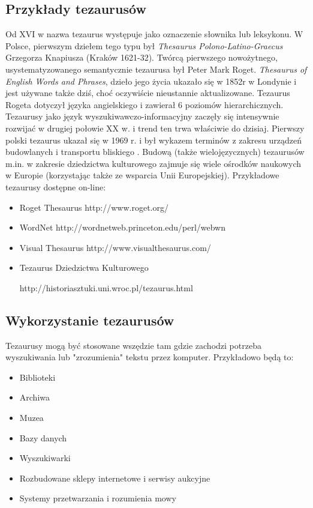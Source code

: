 \documentclass[12pt,a4paper,notitlepage]{article}
\begin{document}
\subsection{Przykłady tezaurusów}
Od XVI w nazwa tezaurus występuje jako oznaczenie słownika lub leksykonu. W Polsce, pierwszym dziełem tego typu był \textit{ Thesaurus Polono-Latino-Graecus} Grzegorza Knapiusza (Kraków 1621-32). Twórcą pierwszego nowożytnego, usystematyzowanego semantycznie tezaurusa był Peter Mark Roget. \textit{Thesaurus of English Words and Phrases}, dzieło jego życia ukazało się w 1852r w Londynie i jest używane także dziś, choć oczywiście nieustannie aktualizowane. Tezaurus Rogeta dotyczył języka angielskiego i zawierał 6 poziomów hierarchicznych. Tezaurusy jako język wyszukiwawczo-informacyjny zaczęły się intensywnie rozwijać w drugiej połowie XX w. i trend ten trwa właściwie do dzisiaj. Pierwszy polski tezaurus ukazał się w 1969 r. i był wykazem terminów z zakresu urządzeń budowlanych i transportu bliskiego \cite{Sosinska}. Budową (także wielojęzycznych) tezaurusów m.in. w zakresie dziedzictwa kulturowego zajmuje się wiele ośrodków naukowych w Europie (korzystając także ze wsparcia Unii Europejskiej).
Przykładowe tezaurusy dostępne on-line:
\begin{itemize}
    \item Roget Thesaurus http://www.roget.org/
	\item WordNet http://wordnetweb.princeton.edu/perl/webwn
	\item Visual Thesaurus http://www.visualthesaurus.com/
	\item Tezaurus Dziedzictwa Kulturowego 

http://historiasztuki.uni.wroc.pl/tezaurus.html
\end{itemize}  

\subsection{Wykorzystanie tezaurusów}
Tezaurusy mogą być stosowane wszędzie tam gdzie zachodzi potrzeba wyszukiwania lub "zrozumienia" tekstu przez komputer. Przykładowo będą to: 
\begin{itemize}
   \item Biblioteki
	\item Archiwa
	\item Muzea
	\item Bazy danych
	\item Wyszukiwarki
	\item Rozbudowane sklepy internetowe i serwisy aukcyjne
	\item Systemy przetwarzania i rozumienia mowy
\end{itemize}
\end{document}
